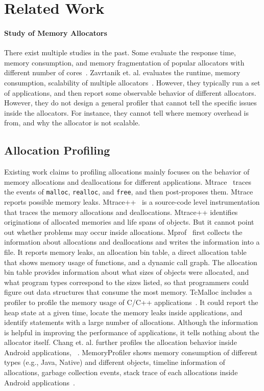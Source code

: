 \section{Related Work}

\paragraph{Study of Memory Allocators} There exist multiple studies in the past. Some evaluate the response time, memory consumption, and memory fragmentation of  popular allocators with different number of cores~\cite{6084042, ferreira2011comparison}. Zavrtanik et. al. evaluates the runtime, memory consumption, scalability of multiple allocators~\cite{zavrtanikexperimental}. However, they typically run a set of applications, and then report some observable behavior of different allocators. However, they do not design a general profiler that cannot tell the specific issues inside the allocators. For instance, they cannot tell where memory overhead is from, and why the allocator is not scalable. 


\subsection{Allocation Profiling} Existing work claims to profiling allocations mainly focuses on the behavior of memory allocations and deallocations for different applications. Mtrace~\cite{mtrace} traces the events of \texttt{malloc}, \texttt{realloc}, and \texttt{free}, and then post-proposes them. Mtrace reports possible memory leaks. Mtrace++~\cite{Lee:2000:DMM:786772.787150} is a source-code level instrumentation that traces the memory allocations and deallocations. Mtrace++ identifies originations of allocated memories and life spans of objects. But it cannot point out whether problems may occur inside allocations. 
Mprof~\cite{Zorn:1988:MAP:894814} first collects the information about allocations and deallocations and writes the information into a file. It reports memory leaks, an allocation bin table, a direct allocation table that shows memory usage of functions, and a dynamic call graph. The allocation bin table provides information about what sizes of objects were allocated, and what program types correspond to the sizes listed, so that programmers could figure out data structures that consume the most memory. 
TcMalloc includes a profiler to profile the memory usage of C/C++ applications~\cite{ghemawat2007tcmalloc}. It could report the heap state at a given time, locate the memory leaks inside applications, and identify statements with a large number of allocations. Although the information is helpful in improving the performance of applications, it tells nothing about the allocator itself. Chang et. al. further profiles the allocation behavior inside Android applications, ~\cite{7031343}. MemoryProfiler shows memory consumption of different types (e.g., Java, Native) and different objects, timeline information of allocations, garbage collection events, stack trace of each allocations inside Android applications~\cite{MemoryProfiler}. 

